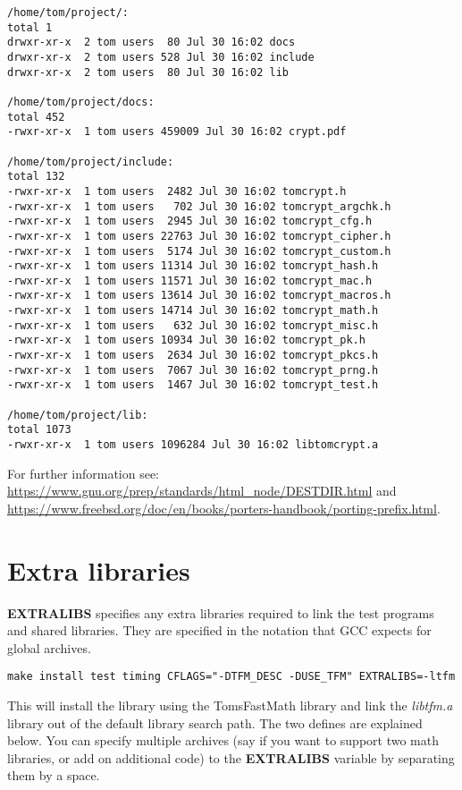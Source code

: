 \documentclass[synpaper]{book}
\newcommand{\mysection}[1]    %
	{                   %
	\section{#1}
   \markboth{\textsf{www.libtom.net}}{\thesection ~ {#1}}
	}
\begin{document}
\begin{small}
\begin{verbatim}
/home/tom/project/:
total 1
drwxr-xr-x  2 tom users  80 Jul 30 16:02 docs
drwxr-xr-x  2 tom users 528 Jul 30 16:02 include
drwxr-xr-x  2 tom users  80 Jul 30 16:02 lib

/home/tom/project/docs:
total 452
-rwxr-xr-x  1 tom users 459009 Jul 30 16:02 crypt.pdf

/home/tom/project/include:
total 132
-rwxr-xr-x  1 tom users  2482 Jul 30 16:02 tomcrypt.h
-rwxr-xr-x  1 tom users   702 Jul 30 16:02 tomcrypt_argchk.h
-rwxr-xr-x  1 tom users  2945 Jul 30 16:02 tomcrypt_cfg.h
-rwxr-xr-x  1 tom users 22763 Jul 30 16:02 tomcrypt_cipher.h
-rwxr-xr-x  1 tom users  5174 Jul 30 16:02 tomcrypt_custom.h
-rwxr-xr-x  1 tom users 11314 Jul 30 16:02 tomcrypt_hash.h
-rwxr-xr-x  1 tom users 11571 Jul 30 16:02 tomcrypt_mac.h
-rwxr-xr-x  1 tom users 13614 Jul 30 16:02 tomcrypt_macros.h
-rwxr-xr-x  1 tom users 14714 Jul 30 16:02 tomcrypt_math.h
-rwxr-xr-x  1 tom users   632 Jul 30 16:02 tomcrypt_misc.h
-rwxr-xr-x  1 tom users 10934 Jul 30 16:02 tomcrypt_pk.h
-rwxr-xr-x  1 tom users  2634 Jul 30 16:02 tomcrypt_pkcs.h
-rwxr-xr-x  1 tom users  7067 Jul 30 16:02 tomcrypt_prng.h
-rwxr-xr-x  1 tom users  1467 Jul 30 16:02 tomcrypt_test.h

/home/tom/project/lib:
total 1073
-rwxr-xr-x  1 tom users 1096284 Jul 30 16:02 libtomcrypt.a
\end{verbatim}
\end{small}

For further information see: \url{https://www.gnu.org/prep/standards/html_node/DESTDIR.html}
and \url{https://www.freebsd.org/doc/en/books/porters-handbook/porting-prefix.html}.

\mysection{Extra libraries}
\textbf{EXTRALIBS} specifies any extra libraries required to link the test programs and shared libraries.  They are specified in the notation
that GCC expects for global archives.

\begin{verbatim}
make install test timing CFLAGS="-DTFM_DESC -DUSE_TFM" EXTRALIBS=-ltfm
\end{verbatim}

This will install the library using the TomsFastMath library and link the \textit{libtfm.a} library out of the default library search path.  The two
defines are explained below.  You can specify multiple archives (say if you want to support two math libraries, or add on additional code) to
the \textbf{EXTRALIBS} variable by separating them by a space.
\end{document}
